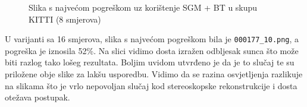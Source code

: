 \documentclass[utf8, zavrsni, numeric]{fer}
\begin{document}
\begin{figure}[H]
  \centering
  
  \centering

  \centering

  \caption{Slika s najvećom pogreškom uz korištenje SGM + BT u skupu KITTI (8 smjerova)}
\end{figure}

U varijanti sa 16 smjerova, slika s najvećom pogreškom bila je {\verb|000177_10.png|}, a
pogreška je iznosila 52\%. Na slici vidimo dosta izražen odbljesak sunca što može biti
razlog tako lošeg rezultata. Boljim uvidom utvrđeno je da je to slučaj te su priložene obje
slike za lakšu usporedbu. Vidimo da se razina osvjetljenja razlikuje na slikama što je
vrlo nepovoljan slučaj kod stereoskopske rekonstrukcije i dosta otežava postupak.
\end{document}
